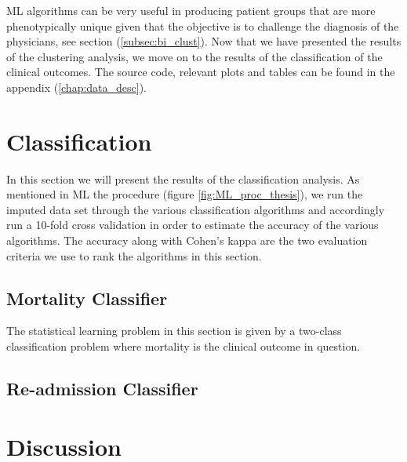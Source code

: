 \documentclass[../thesis.tex]{subfiles}
\begin{document}
ML algorithms can be very useful in producing patient groups that are more phenotypically unique given that the objective is to challenge the diagnosis of the physicians, see section (\ref{subsec:bi_clust}). Now that we have presented the results of the clustering analysis, we move on to the results of the classification of the clinical outcomes. The source code, relevant plots and tables can be found in the appendix (\ref{chap:data_desc}).

\section{Classification}

\noindent In this section we will present the results of the classification analysis. As mentioned in ML the procedure (figure \ref{fig:ML_proc_thesis}), we run the imputed data set through the various classification algorithms and accordingly run a 10-fold cross validation in order to estimate the accuracy of the various algorithms. The accuracy along with Cohen’s kappa are the two evaluation criteria we use to rank the algorithms in this section.

\subsection{Mortality Classifier}

\noindent The statistical learning problem in this section is given by a two-class
classification problem where mortality is the clinical outcome in question.

\subsection{Re-admission Classifier}

\section{Discussion}
\end{document}
